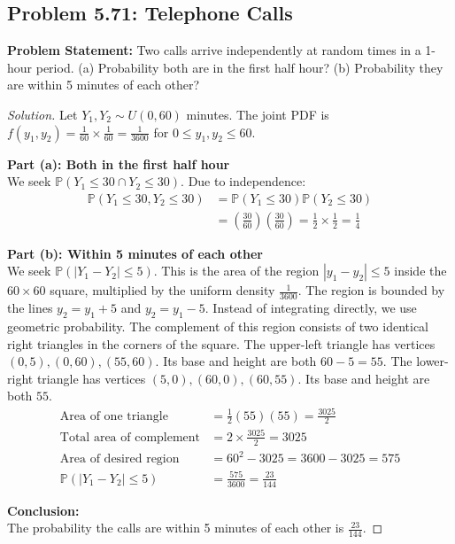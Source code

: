 \documentclass[11pt, a4paper]{article}
\theoremstyle{definition}
\theoremstyle{remark}
\newcommand{\Prob}{\mathbb{P}}
\begin{document}
\subsection{Problem 5.71: Telephone Calls}
\textbf{Problem Statement:} Two calls arrive independently at random times in a 1-hour period. 
(a) Probability both are in the first half hour? 
(b) Probability they are within 5 minutes of each other?

\begin{proof}[Solution]
Let $Y_1, Y_2 \sim U(0, 60)$ minutes. The joint PDF is $f(y_1, y_2) = \frac{1}{60} \times \frac{1}{60} = \frac{1}{3600}$ for $0 \leq y_1, y_2 \leq 60$.

\textbf{Part (a): Both in the first half hour}\\
We seek $\Prob(Y_1 \leq 30 \cap Y_2 \leq 30)$. Due to independence:
\begin{align*}
\Prob(Y_1 \leq 30, Y_2 \leq 30) &= \Prob(Y_1 \leq 30) \Prob(Y_2 \leq 30) \\
&= \left( \frac{30}{60} \right) \left( \frac{30}{60} \right) = \frac{1}{2} \times \frac{1}{2} = \frac{1}{4}
\end{align*}

\textbf{Part (b): Within 5 minutes of each other}\\
We seek $\Prob(|Y_1 - Y_2| \leq 5)$. This is the area of the region $|y_1 - y_2| \leq 5$ inside the $60 \times 60$ square, multiplied by the uniform density $\frac{1}{3600}$.
The region is bounded by the lines $y_2 = y_1 + 5$ and $y_2 = y_1 - 5$.
Instead of integrating directly, we use geometric probability. The complement of this region consists of two identical right triangles in the corners of the square.
The upper-left triangle has vertices $(0,5), (0,60), (55,60)$. Its base and height are both $60 - 5 = 55$.
The lower-right triangle has vertices $(5,0), (60,0), (60,55)$. Its base and height are both $55$.
\begin{align*}
\text{Area of one triangle} &= \frac{1}{2} (55)(55) = \frac{3025}{2} \\
\text{Total area of complement} &= 2 \times \frac{3025}{2} = 3025 \\
\text{Area of desired region} &= 60^2 - 3025 = 3600 - 3025 = 575 \\
\Prob(|Y_1 - Y_2| \leq 5) &= \frac{575}{3600} = \frac{23}{144}
\end{align*}

\textbf{Conclusion:}\\
The probability the calls are within 5 minutes of each other is $\frac{23}{144}$.
\end{proof}
\end{document}
